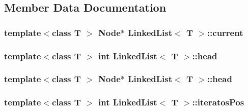 \subsection{Member Data Documentation}
\hypertarget{class_linked_list_ac31fae6ecb440b8d069790e5294f82fe}{
\subsubsection[{current}]{\setlength{\rightskip}{0pt plus 5cm}template$<$class T $>$ {\bf Node}$\ast$ {\bf Linked\-List}$<$ T $>$\-::current\hspace{0.3cm}{\ttfamily [protected]}}}\label{class_linked_list_ac31fae6ecb440b8d069790e5294f82fe}
\hypertarget{class_linked_list_a2e6a6b5a560b362c8f03cca2183c2710}{
\subsubsection[{head}]{\setlength{\rightskip}{0pt plus 5cm}template$<$class T $>$ int {\bf Linked\-List}$<$ T $>$\-::head\hspace{0.3cm}{\ttfamily [protected]}}}\label{class_linked_list_a2e6a6b5a560b362c8f03cca2183c2710}
\hypertarget{class_linked_list_a2d1f848e19caa3f180b7fa6938125bba}{
\subsubsection[{head}]{\setlength{\rightskip}{0pt plus 5cm}template$<$class T $>$ {\bf Node}$\ast$ {\bf Linked\-List}$<$ T $>$\-::head\hspace{0.3cm}{\ttfamily [protected]}}}\label{class_linked_list_a2d1f848e19caa3f180b7fa6938125bba}
\hypertarget{class_linked_list_ae6821bb450a08c7e918e477b747667c1}{
\subsubsection[{iteratos\-Pos}]{\setlength{\rightskip}{0pt plus 5cm}template$<$class T $>$ int {\bf Linked\-List}$<$ T $>$\-::iteratos\-Pos\hspace{0.3cm}{\ttfamily [protected]}}}\label{class_linked_list_ae6821bb450a08c7e918e477b747667c1}

